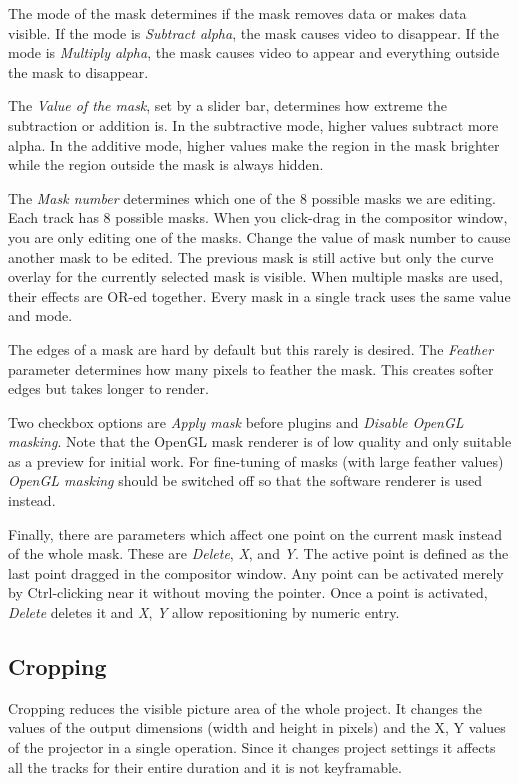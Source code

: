 The mode of the mask determines if the mask removes data or makes data visible. 
If the mode is \emph{Subtract alpha}, the mask causes video to disappear. 
If the mode is \emph{Multiply alpha}, the mask causes video to appear and everything outside the mask to disappear.

The \emph{Value of the mask}, set by a slider bar, determines how extreme the subtraction or addition is. 
In the subtractive mode, higher values subtract more alpha. 
In the additive mode, higher values make the region in the mask brighter while the region outside the mask is always hidden.

The \emph{Mask number} determines which one of the 8 possible masks we are editing. 
Each track has 8 possible masks. 
When you click-drag in the compositor window, you are only editing one of the masks. 
Change the value of mask number to cause another mask to be edited. 
The previous mask is still active but only the curve overlay for the currently selected mask is visible. 
When multiple masks are used, their effects are OR-ed together. 
Every mask in a single track uses the same value and mode.

The edges of a mask are hard by default but this rarely is desired. 
The \emph{Feather} parameter determines how many pixels to feather the mask. 
This creates softer edges but takes longer to render. 

Two checkbox options are \emph{Apply mask} before plugins and \emph{Disable OpenGL masking}.  
Note that the OpenGL mask renderer is of low quality and only suitable as a preview for initial work. 
For fine-tuning of masks (with large feather values) \emph{OpenGL masking} should be switched off so that the software renderer is used instead.

Finally, there are parameters which affect one point on the current mask instead of the whole mask. 
These are \emph{Delete}, \emph{X}, and \emph{Y}. 
The active point is defined as the last point dragged in the compositor window. 
Any point can be activated merely by Ctrl-clicking near it without moving the pointer. 
Once a point is activated, \emph{Delete} deletes it and \emph{X}, \emph{Y} allow repositioning by numeric entry.

\subsection{Cropping}%
\label{sub:cropping}



Cropping reduces the visible picture area of the whole project. It changes the values of the output dimensions (width and height in pixels) and the X, Y values of the projector in a single operation. Since it changes project settings it affects all the tracks for their entire duration and it is not keyframable. 

